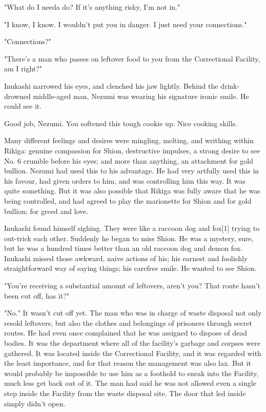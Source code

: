"What do I needa do? If it's anything risky, I'm not in."

"I know, I know. I wouldn't put you in danger. I just need your
connections."

"Connections?"

"There's a man who passes on leftover food to you from the Correctional
Facility, am I right?"

Inukashi narrowed his eyes, and clenched his jaw lightly. Behind the
drink-drowned middle-aged man, Nezumi was wearing his signature ironic
smile. He could see it.

Good job, Nezumi. You softened this tough cookie up. Nice cooking
skills.

Many different feelings and desires were mingling, melting, and writhing
within Rikiga: genuine compassion for Shion, destructive impulses, a
strong desire to see No. 6 crumble before his eyes; and more than
anything, an attachment for gold bullion. Nezumi had used this to his
advantage. He had very artfully used this in his favour, had given
orders to him, and was controlling him this way. It was quite something.
But it was also possible that Rikiga was fully aware that he was being
controlled, and had agreed to play the marionette for Shion and for gold
bullion; for greed and love.

Inukashi found himself sighing. They were like a raccoon dog and
fox{[}1{]} trying to out-trick each other. Suddenly he began to miss
Shion. He was a mystery, sure, but he was a hundred times better than an
old raccoon dog and demon fox. Inukashi missed those awkward, naive
actions of his; his earnest and foolishly straightforward way of saying
things; his carefree smile. He wanted to see Shion.

"You're receiving a substantial amount of leftovers, aren't you? That
route hasn't been cut off, has it?"

"No." It wasn't cut off yet. The man who was in charge of waste disposal
not only resold leftovers, but also the clothes and belongings of
prisoners through secret routes. He had even once complained that he was
assigned to dispose of dead bodies. It was the department where all of
the facility's garbage and corpses were gathered. It was located inside
the Correctional Facility, and it was regarded with the least
importance, and for that reason the management was also lax. But it
would probably be impossible to use him as a foothold to sneak into the
Facility, much less get back out of it. The man had said he was not
allowed even a single step inside the Facility from the waste disposal
site. The door that led inside simply didn't open.

